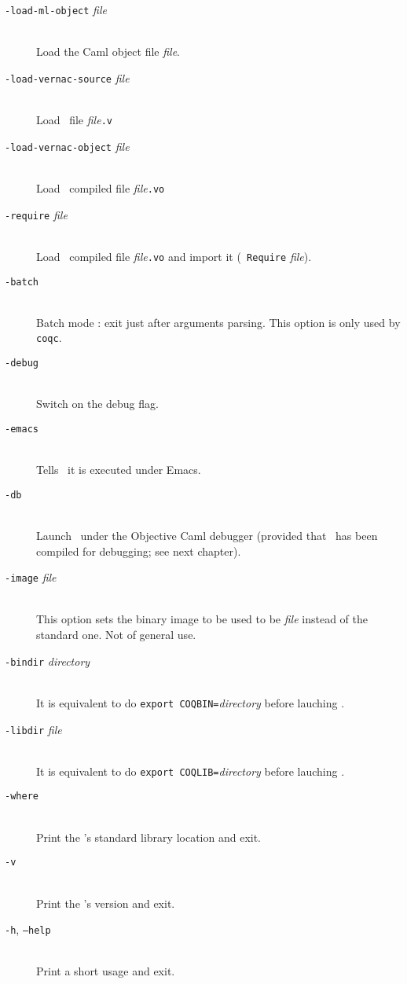 \begin{description}
\item[{\tt -load-ml-object} {\em file}]\ \\
  Load the Caml object file {\em file}.

\item[{\tt -load-vernac-source} {\em file}]\ \\
  Load \Coq~file {\em file}{\tt .v}

\item[{\tt -load-vernac-object} {\em file}]\ \\
  Load \Coq~compiled file {\em file}{\tt .vo}

%
\item[{\tt -require} {\em file}]\ \\
  Load \Coq~compiled file {\em file}{\tt .vo} and import it ({\tt
    Require} {\em file}).

\item[{\tt -batch}]\ \\
  Batch mode : exit just after arguments parsing. This option is only
  used by {\tt coqc}.

\item[{\tt -debug}]\ \\
  Switch on the debug flag.

\item[{\tt -emacs}]\ \\
  Tells \Coq\ it is executed under Emacs.

\item[{\tt -db}]\ \\
  Launch \Coq\ under the Objective Caml debugger (provided that \Coq\
  has been compiled for debugging; see next chapter).

\item[{\tt -image} {\em file}]\ \\
  This option sets the binary image to be used to be {\em file}
  instead of the standard one. Not of general use.

\item[{\tt -bindir} {\em directory}]\ \\
  It is equivalent to do \texttt{export COQBIN=}{\em directory}
  before lauching \Coq.

\item[{\tt -libdir} {\em file}]\ \\
  It is equivalent to do \texttt{export COQLIB=}{\em directory}
  before lauching \Coq.
  

\item[{\tt -where}]\ \\
  Print the \Coq's standard library location and exit.

\item[{\tt -v}]\ \\
  Print the \Coq's version and exit.

\item[{\tt -h}, {\tt --help}]\ \\
  Print a short usage and exit.
\end{description}

